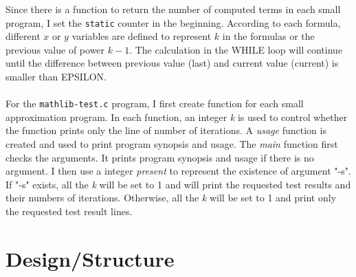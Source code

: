 \documentclass[12pt]{article}
\begin{document}
Since there is a function to return the number of computed terms in each small program, I set the \texttt{static} counter in the beginning. According to each formula, different $x$ or $y$ variables are defined to represent $k$ in the formulas or the previous value of power $k-1$. The calculation in the WHILE loop will continue until the difference between previous value (last) and current value (current) is smaller than EPSILON. \\
\\
For the \texttt{mathlib-test.c} program, I first create function for each small approximation program. In each function, an integer \textit{k} is used to control whether the function prints only the line of number of iterations. A \textit{usage} function is created and used to print program synopsis and usage. The \textit{main} function first checks the arguments. It prints program synopsis and usage if there is no argument. I then use a integer \textit{present} to represent the existence of argument "-s". If "-s" exists, all the \textit{k} will be set to 1 and will print the requested test results and their numbers of iterations. Otherwise, all the \textit{k} will be set to 1 and print only the requested test result lines. \\

\section{Design/Structure}
\end{document}
